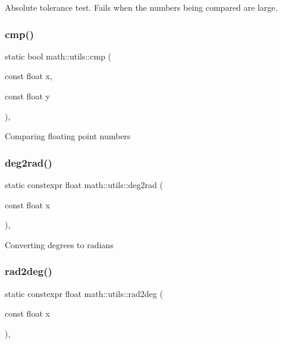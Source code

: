 Absolute tolerance test. Fails when the numbers being compared are large. \mbox{\label{structmath_1_1utils_ac138b736f332b03adfac51baaad6027a}} 
\subsubsection{\texorpdfstring{cmp()}{cmp()}}
{\footnotesize\ttfamily static bool math\+::utils\+::cmp (\begin{DoxyParamCaption}\item[{const float}]{x,  }\item[{const float}]{y }\end{DoxyParamCaption})\hspace{0.3cm}{\ttfamily [inline]}, {\ttfamily [static]}}

Comparing floating point numbers \mbox{\label{structmath_1_1utils_a321e2eedf82d272a8b92e774f9060c0b}} 
\subsubsection{\texorpdfstring{deg2rad()}{deg2rad()}}
{\footnotesize\ttfamily static constexpr float math\+::utils\+::deg2rad (\begin{DoxyParamCaption}\item[{const float}]{x }\end{DoxyParamCaption})\hspace{0.3cm}{\ttfamily [inline]}, {\ttfamily [static]}}

Converting degrees to radians \mbox{\label{structmath_1_1utils_aea1d3fa9a81bce6626a0bb6d2ef3d982}} 
\subsubsection{\texorpdfstring{rad2deg()}{rad2deg()}}
{\footnotesize\ttfamily static constexpr float math\+::utils\+::rad2deg (\begin{DoxyParamCaption}\item[{const float}]{x }\end{DoxyParamCaption})\hspace{0.3cm}{\ttfamily [inline]}, {\ttfamily [static]}}

